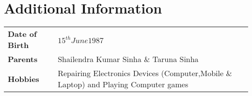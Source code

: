 \documentclass[letterpaper, 12 pt]{article}
\begin{document}
		\section{Additional Information}
			\begin{tabular}{m{} m{}}
				\textbf{Date of Birth} & $15^{th} June 1987$  \\
				\textbf{Parents} & Shailendra Kumar Sinha \& Taruna Sinha  \\
				\textbf{Hobbies} & Repairing Electronics Devices (Computer,Mobile \& Laptop)   and Playing Computer games  \\	
			\end{tabular}
			

		
\end{document}
